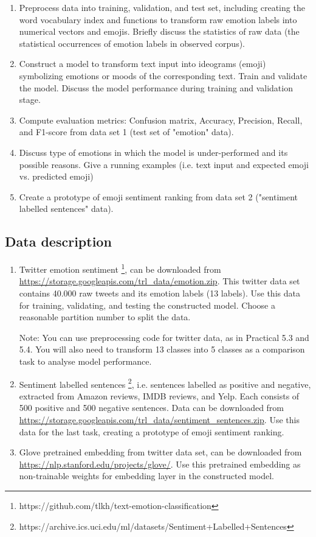 \documentclass[a4paper,twoside,10pt]{article}
\begin{document}
\begin{enumerate}
    \item Preprocess data into training, validation, and test set, including creating the word vocabulary index and functions to transform raw emotion labels into numerical vectors and emojis. Briefly discuss the statistics of raw data (the statistical occurrences of emotion labels in observed corpus). 
    \item Construct a model to transform text input into ideograms (emoji) symbolizing emotions or moods of the corresponding text. Train and validate the model. Discuss the model performance during training and validation stage.
    \item Compute evaluation metrics: Confusion matrix, Accuracy, Precision, Recall, and F1-score from data set 1 (test set of "emotion" data).
    \item Discuss type of emotions in which the model is under-performed and its possible reasons. Give a running examples (i.e. text input and expected emoji vs. predicted emoji)
    \item Create a prototype of emoji sentiment ranking from data set 2 ("sentiment labelled sentences" data).
    
\end{enumerate}
\newpage
\subsection*{Data description}

\begin{enumerate}
    \item Twitter emotion sentiment \footnote{https://github.com/tlkh/text-emotion-classification}, can be downloaded from \url{https://storage.googleapis.com/trl_data/emotion.zip}. This twitter data set contains 40.000 raw tweets and its emotion labels (13 labels). Use this data for training, validating, and testing the constructed model. Choose a reasonable partition number to split the data.
    
    Note: You can use preprocessing code for twitter data, as in Practical 5.3 and 5.4. You will also need to transform 13 classes into 5 classes as a comparison task to analyse model performance. 
    
    \item Sentiment labelled sentences \footnote{https://archive.ics.uci.edu/ml/datasets/Sentiment+Labelled+Sentences}, i.e. sentences labelled as positive and negative, extracted from Amazon reviews, IMDB reviews, and Yelp. Each consists of 500 positive and 500 negative sentences. Data can be downloaded from \url{https://storage.googleapis.com/trl_data/sentiment_sentences.zip}. Use this data for the last task, creating a prototype of emoji sentiment ranking.
    
    \item Glove pretrained embedding from twitter data set, can be downloaded from \url{https://nlp.stanford.edu/projects/glove/}. Use this pretrained embedding as non-trainable weights for embedding layer in the constructed model.
    
\end{enumerate}
\end{document}

